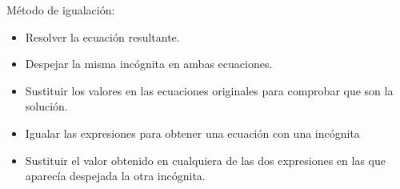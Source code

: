 \documentclass[12pt,addpoints]{repaso}
\begin{document}
\begin{questions}
{\begin{choices}
            \choice M\'etodo de igualaci\'on:
            \begin{itemize}
                \item[\rule{1cm}{0.2mm}] Resolver la ecuaci\'on resultante.
                \item[\rule{1cm}{0.2mm}] Despejar la misma inc\'ognita en ambas ecuaciones.
                \item[\rule{1cm}{0.2mm}] Sustituir los valores en las ecuaciones originales para comprobar que son la soluci\'on.
                \item[\rule{1cm}{0.2mm}] Igualar las expresiones para obtener una ecuaci\'on con una inc\'ognita
                \item[\rule{1cm}{0.2mm}] Sustituir el valor obtenido en cualquiera de las dos expresiones en las que aparec\'ia despejada la otra inc\'ognita.
            \end{itemize}
        \end{choices}
    }


\end{questions}
\end{document}
